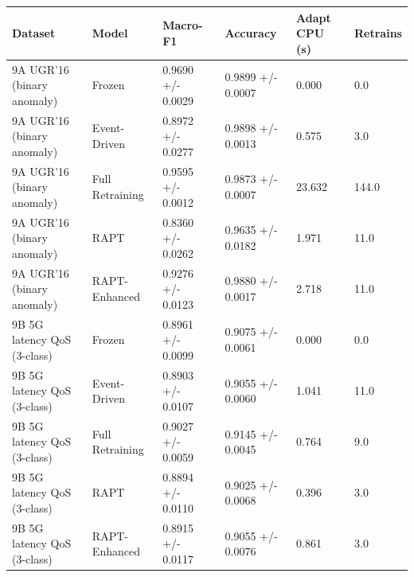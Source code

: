 \begin{tabular}{llllll}
\toprule
Dataset & Model & Macro-F1 & Accuracy & Adapt CPU (s) & Retrains \\
\midrule
9A UGR'16 (binary anomaly) & Frozen & 0.9690 +/- 0.0029 & 0.9899 +/- 0.0007 & 0.000 & 0.0 \\
9A UGR'16 (binary anomaly) & Event-Driven & 0.8972 +/- 0.0277 & 0.9898 +/- 0.0013 & 0.575 & 3.0 \\
9A UGR'16 (binary anomaly) & Full Retraining & 0.9595 +/- 0.0012 & 0.9873 +/- 0.0007 & 23.632 & 144.0 \\
9A UGR'16 (binary anomaly) & RAPT & 0.8360 +/- 0.0262 & 0.9635 +/- 0.0182 & 1.971 & 11.0 \\
9A UGR'16 (binary anomaly) & RAPT-Enhanced & 0.9276 +/- 0.0123 & 0.9880 +/- 0.0017 & 2.718 & 11.0 \\
9B 5G latency QoS (3-class) & Frozen & 0.8961 +/- 0.0099 & 0.9075 +/- 0.0061 & 0.000 & 0.0 \\
9B 5G latency QoS (3-class) & Event-Driven & 0.8903 +/- 0.0107 & 0.9055 +/- 0.0060 & 1.041 & 11.0 \\
9B 5G latency QoS (3-class) & Full Retraining & 0.9027 +/- 0.0059 & 0.9145 +/- 0.0045 & 0.764 & 9.0 \\
9B 5G latency QoS (3-class) & RAPT & 0.8894 +/- 0.0110 & 0.9025 +/- 0.0068 & 0.396 & 3.0 \\
9B 5G latency QoS (3-class) & RAPT-Enhanced & 0.8915 +/- 0.0117 & 0.9055 +/- 0.0076 & 0.861 & 3.0 \\
\bottomrule
\end{tabular}
